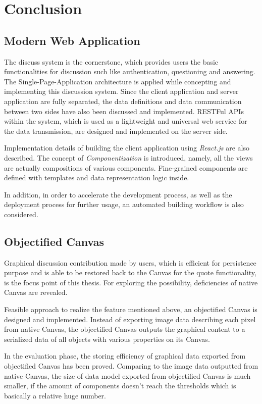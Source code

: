 \section{Conclusion}

\subsection{Modern Web Application}

The discuss system is the cornerstone, which provides users the basic functionalities for discussion such like authentication, questioning and answering. The Single-Page-Application architecture is applied while concepting and implementing this discussion system. Since the client application and server application are fully separated, the data definitions and data communication between two sides have also been discussed and implemented. RESTFul APIs within the system, which is used as a lightweight and universal web service for the data transmission, are designed and implemented on the server side.

Implementation details of building the client application using \textit{React.js} are also described. The concept of \textit{Componentization} is introduced, namely, all the views are actually compositions of various components. Fine-grained components are defined with templates and data representation logic inside.

In addition, in order to accelerate the development process, as well as the deployment process for further usage, an automated building workflow is also considered. 


\subsection{Objectified Canvas}

Graphical discussion contribution made by users, which is efficient for persistence purpose and is able to be restored back to the Canvas for the quote functionality, is the focus point of this thesis. For exploring the possibility, deficiencies of native Canvas are revealed. 

Feasible approach to realize the feature mentioned above, an objectified Canvas is designed and implemented. Instead of exporting image data describing each pixel from native Canvas, the objectified Canvas outputs the graphical content to a serialized data  of all objects with various properties on its Canvas. 

In the evaluation phase, the storing efficiency of graphical data exported from objectified Canvas has been proved. Comparing to the image data outputted from native Canvas, the size of data model exported from objectified Canvas is much smaller, if the amount of components doesn't reach the thresholds which is basically a relative huge number.


